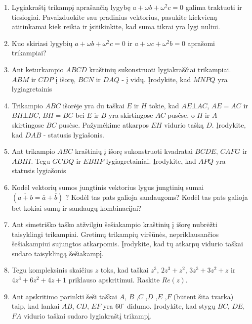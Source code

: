 \begin{enumerate}
 
\item Lygiakraštį trikampį aprašančią lygybę $a + \omega b + \omega^2 c = 0$ galima traktuoti ir tiesiogiai. Pavaizduokite sau pradinius vektorius, pasukite kiekvieną atitinkamai kiek reikia ir įsitikinkite, kad suma tikrai yra lygi nuliui. 

\item Kuo skiriasi lygybių $a+\omega b + \omega^2 c = 0$ ir $a + \omega c + \omega^2 b = 0$ aprašomi trikampiai?

\item Ant keturkampio $ABCD$ kraštinių sukonstruoti lygiakraščiai trikampiai. $ABM$ ir $CDP$ į išorę, $BCN$ ir $DAQ$ - į vidų. Įrodykite, kad $MNPQ$ yra lygiagretainis

\item Trikampio $ABC$ išorėje yra du taškai $E$ ir $H$ tokie, kad $AE \bot AC$, $AE=AC$ ir $BH\bot BC$, $BH = BC$ bei $E$ ir $B$ yra skirtingose $AC$ pusėse, o $H$ ir $A$ skirtingose $BC$ pusėse. Pažymėkime atkarpos $EH$ vidurio tašką $D$. Įrodykite, kad $DAB$ - statusis lygiašonis. 

\item Ant trikampio $ABC$ kraštinių į išorę sukonstruoti kvadratai $BCDE$, $CAFG$ ir $ABHI$. Tegu $GCDQ$ ir $EBHP$ lygiagretainiai. Įrodykite, kad $APQ$ yra statusis lygiašonis

\item Kodėl vektorių sumos jungtinis vektorius lygus jungtinių sumai $(\overline{a + b} = \bar{a} + \bar{b})$ ? Kodėl tas pats galioja sandaugoms? Kodėl tas pats galioja bet kokiai sumų ir sandaugų kombinacijai?

\item Ant simetriško taško atžvilgiu šešiakampio kraštinių į išorę nubrėžti taisyklingi trikampiai. Gretimų trikampių viršūnės, nepriklausančios šešiakampiui sujungtos atkarpomis. Įrodykite, kad tų atkarpų vidurio taškai sudaro taisyklingą šešiakampį. 

\item Tegu kompleksinis skaičius $z$ toks, kad taškai $z^3$, $2z^3 + z^2$, $3z^3 + 3z^2 + z$ ir $4z^3 + 6z^2 + 4z + 1$ priklauso apskritimui. Raskite $Re(z)$.

\item Ant apskritimo parinkti šeši taškai $A$, $B$ ,$C$ ,$D$ ,$E$ ,$F$ (būtent šita tvarka) taip, kad lankai $AB$, $CD$, $EF$ yra $60^{\circ}$ didumo. Įrodykite, kad stygų $BC$, $DE$, $FA$ vidurio taškai sudaro lygiakraštį trikampį. 


\end{enumerate}
